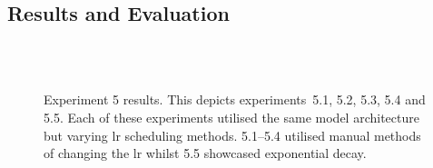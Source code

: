 \subsection{Results and Evaluation}
\begin{figure}
\centering
    \\
    \\
\caption[Experiment 5 results]{Experiment 5 results. This depicts experiments~5.1, 5.2, 5.3, 5.4 and 5.5. Each of these experiments utilised the same model architecture but varying \acrshort{lr} scheduling methods. 5.1--5.4 utilised manual methods of changing the \acrshort{lr} whilst 5.5 showcased exponential decay.}
\label{fig:5 results}
\end{figure}
